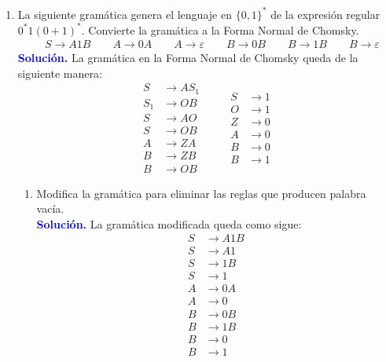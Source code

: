 \documentclass[11pt,fleqn]{article}
\newcommand{\solution}{\textcolor{blue}{\textbf{Solución. }}}
\begin{document}
\begin{enumerate}
    \item La siguiente gramática genera el lenguaje en $\{0,1\}^*$ de la expresión regular $0^*1(0+1)^*$. Convierte la gramática a la Forma Normal de Chomsky.
    \begin{gather*}
        \quad S \rightarrow A1B \qquad A \rightarrow 0A \qquad A \rightarrow \varepsilon \qquad B \rightarrow 0B \qquad B \rightarrow 1B \qquad B \rightarrow \varepsilon
    \end{gather*}
    \solution La gramática en la Forma Normal de Chomsky queda de la siguiente manera:
    \begin{equation*}
        \begin{split}
            S &\rightarrow AS_1 \\
            S_1 &\rightarrow OB \\
            S &\rightarrow AO \\
            S &\rightarrow OB \\
            A &\rightarrow ZA \\
            B &\rightarrow ZB \\
            B &\rightarrow OB
        \end{split} \qquad  
        \begin{split}
            S &\rightarrow 1 \\
            O &\rightarrow 1 \\
            Z &\rightarrow 0 \\
            A &\rightarrow 0 \\
            B &\rightarrow 0 \\
            B &\rightarrow 1
        \end{split}
    \end{equation*}

    \begin{enumerate}
        \item Modifica la gramática para eliminar las reglas que producen palabra vacía. \\
        \solution La gramática modificada queda como sigue:
        \begin{align*}
            S &\rightarrow A1B \\
            S &\rightarrow A1 \\
            S &\rightarrow 1B \\
            S &\rightarrow 1 \\
            A &\rightarrow 0A \\
            A &\rightarrow 0 \\
            B &\rightarrow 0B \\
            B &\rightarrow 1B \\
            B &\rightarrow 0 \\
            B &\rightarrow 1
        \end{align*}
        

\end{enumerate}
\end{enumerate}
\end{document}
